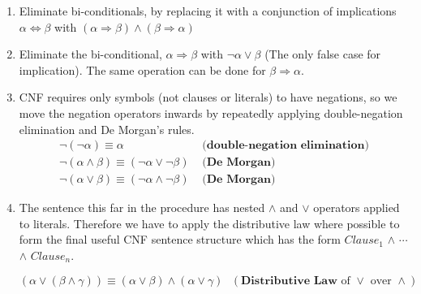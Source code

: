 \begin{enumerate}

	\item Eliminate bi-conditionals, by replacing it with a conjunction of implications $\alpha \Leftrightarrow \beta$ with $(\alpha \Rightarrow \beta) \wedge (\beta \Rightarrow \alpha)$
	
	\item Eliminate the bi-conditional, $\alpha \Rightarrow \beta$ with $\neg \alpha \vee \beta$ (The only false case for implication). The same operation can be done for $\beta \Rightarrow \alpha$.
	
	\item CNF requires only symbols (not clauses or literals) to have negations, so we move the negation operators inwards by repeatedly applying double-negation elimination and De Morgan's rules.
\begin{subequations}
\begin{align}
    \neg (\neg \alpha) \equiv \alpha& \textbf{    (double-negation elimination)} \label{eq:double_neg_elim}\\
       \neg(\alpha \wedge \beta) \equiv (\neg \alpha \vee \neg \beta)& \textbf{    (De Morgan)} \label{eq:DeMorgan1}\\
       \neg(\alpha \vee \beta) \equiv (\neg \alpha \wedge \neg \beta)& \textbf{    (De Morgan)} \label{eq:DeMorgan2}
\end{align}
\end{subequations}

\item The sentence this far in the procedure has nested $\wedge$ and $\vee$ operators applied to literals. Therefore we have to apply the distributive law where possible to form the final useful CNF sentence structure which has the form $Clause_1$ $\wedge$ $\cdots$  $\wedge$ $Clause_n$.

\begin{equation}
       (\alpha \vee (\beta \wedge \gamma) ) \equiv  (\alpha \vee \beta)  \wedge (\alpha \vee \gamma)   \text{  }(\textbf{Distributive Law} \text{ of } \vee \text{ over } \wedge) \label{eq:DibLaw}
\end{equation}
\end{enumerate}





